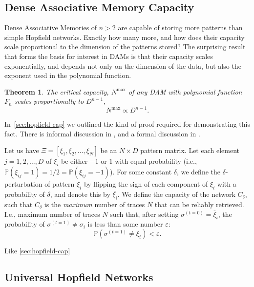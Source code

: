\documentclass{article}
\newtheorem{theorem}{Theorem}[subsection]
\theoremstyle{definition}
\begin{document}
\subsection{Dense Associative Memory Capacity}\label{sec:dam-cap}

Dense Associative Memories of $n > 2$ are capable of storing
more patterns than simple Hopfield networks. Exactly how many more,
and how does their capacity scale proportional to the dimension of
the patterns stored? The surprising result that forms the basis
for interest in DAMs is that their capacity scales exponentially,
and depends not only on the dimension of the data, but also the exponent
used in the polynomial function.

\begin{theorem}
  The critical capacity, $N^\text{max}$ of any DAM with polynomial
  function $F_n$ scales proportionally to $D^{n-1}$,
  $$
  N^\text{max} \propto D^{n-1}.
  $$
\end{theorem}
\noindent
In~\autoref{sec:hopfield-cap} we outlined the kind of proof required for
demonstrating this fact. There is informal discussion in
\textcites{krotov_dense_2016,krotov_dense_2016}, and a formal discussion in 
\textcite{bao_capacity_2022}.

Let us have $\Xi = [\xi_1, \xi_2, \dots, \xi_N]$ be an $N \times D$
pattern matrix. Let each element $j = 1, 2, \dots, D$ of $\xi_i$ be
either $-1$ or $1$ with equal probability (i.e., $\mathbb{P}(\xi_{ij}
= 1) = 1/2 = \mathbb{P}(\xi_{ij} = -1)$). For some constant
$\delta$, we define the $\delta$-perturbation of pattern $\xi_i$
by flipping the sign of each component of $\xi_i$ with a probability 
of $\delta$, and denote this by $\overline{\xi_i}$. We define the 
capacity of the network $C_\delta$, such that $C_\delta$ is the 
\textit{maximum} number of traces $N$ that can be reliably retrieved.
I.e., maximum number of traces $N$ such that,
after setting $\sigma^{(t=0)} = \overline \xi_i$, the probability of 
$\sigma^{(t=1)} \neq \sigma_i$ is less than some number $\varepsilon$:
\begin{equation}
  \mathbb{P}(\sigma^{(t=1)} \neq \xi_i) < \varepsilon.
\end{equation}

Like \autoref{sec:hopfield-cap}


\subsection{Universal Hopfield Networks}\label{sec:uhn}
\end{document}
